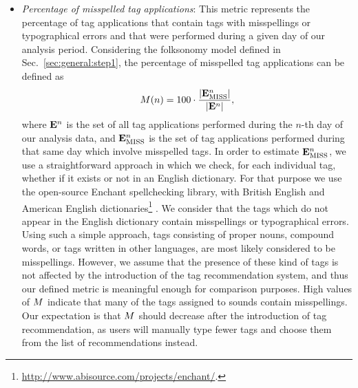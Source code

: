 \begin{itemize}
	\item \textit{Percentage of misspelled tag applications}: This metric represents the percentage of tag applications that contain tags with misspellings or typographical errors and that were performed during a given day of our analysis period. Considering the folksonomy model defined in Sec.~\ref{sec:general:step1}, the percentage of misspelled tag applications can be defined as
\begin{equation} M(n) = 100 \cdot \frac{|\mathbf{E}_{\text{MISS}}^{n}|}{|\mathbf{E}^{n}|}, \end{equation}
where $\mathbf{E}^{n}$ is the set of all tag applications performed during the $n$-th day of our analysis data, and $\mathbf{E}_{\text{MISS}}^{n}$ is the set of tag applications performed during that same day which involve misspelled tags.
In order to estimate $\mathbf{E}_{\text{MISS}}^{n}$, we use a straightforward approach in which we check, for each individual tag, whether if it exists or not in an English dictionary. For that purpose we use the open-source Enchant spellchecking library, with British English and American English dictionaries\footnote{\url{http://www.abisource.com/projects/enchant/}.} \citep[similarly to][]{Guy2006}. 
We consider that the tags which do not appear in the English dictionary contain misspellings or typographical errors.
Using such a simple approach, tags consisting of proper nouns, compound words, or tags written in other languages, are most likely considered to be misspellings. However, we assume that the presence of these kind of tags is not affected by the introduction of the tag recommendation system, and thus our defined metric is meaningful enough for comparison purposes.
High values of $M$ indicate that many of the tags assigned to sounds contain misspellings. 
Our expectation is that $M$ should decrease after the introduction of tag recommendation, as users will manually type fewer tags and choose them from the list of recommendations instead.



\end{itemize}
